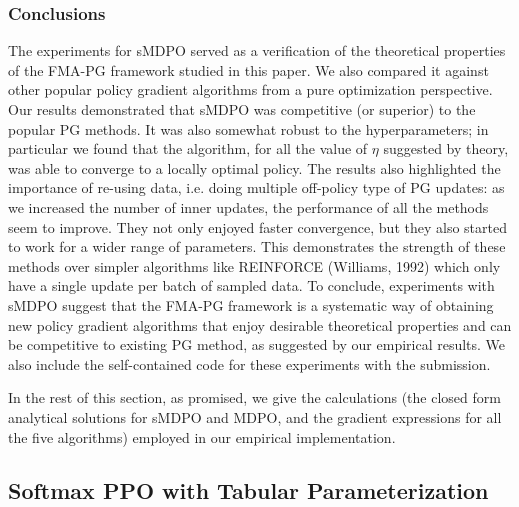 \documentclass[a4paper, 10pt]{article}
\begin{document}
\subsubsection{Conclusions}
The experiments for sMDPO served as a verification of the theoretical properties of the FMA-PG framework studied in this paper. We also compared it against other popular policy gradient algorithms from a pure optimization perspective. Our results demonstrated that sMDPO was competitive (or superior) to the popular PG methods. It was also somewhat robust to the hyperparameters; in particular we found that the algorithm, for all the value of $\eta$ suggested by theory, was able to converge to a locally optimal policy. The results also highlighted the importance of re-using data, i.e. doing multiple off-policy type of PG updates: as we increased the number of inner updates, the performance of all the methods seem to improve. They not only enjoyed faster convergence, but they also started to work for a wider range of parameters. This demonstrates the strength of these methods over simpler algorithms like REINFORCE (Williams, 1992) which only have a single update per batch of sampled data. To conclude, experiments with sMDPO suggest that the FMA-PG framework is a systematic way of obtaining new policy gradient algorithms that enjoy desirable theoretical properties and can be competitive to existing PG method, as suggested by our empirical results. We also include the self-contained code for these experiments with the submission.

In the rest of this section, as promised, we give the calculations (the closed form analytical solutions for sMDPO and MDPO, and the gradient expressions for all the five algorithms) employed in our empirical implementation.

\subsection{Softmax PPO with Tabular Parameterization}
\end{document}
